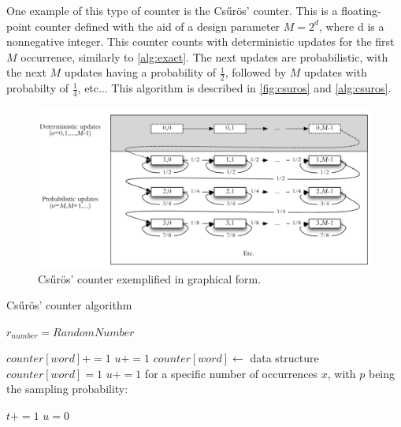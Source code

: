 One example of this type of counter is the Csűrös' counter. %
This is a floating-point counter defined with the aid of a design parameter $M = 2^d$, where d is a nonnegative integer.
This counter counts with deterministic updates for the first $M$ occurrence, similarly to \autoref{alg:exact}.
The next updates are probabilistic, with the next $M$ updates having a probability of $\frac{1}{2}$, followed by $M$ updates with probabilty of $\frac{1}{4}$, etc...
This algorithm is described in \autoref{fig:csuros} and \autoref{alg:csuros}.

\begin{figure}[!ht]
    \centering
    \includegraphics[width=0.9\linewidth]{figs/csuros.png}
    \caption{Csűrös' counter exemplified in graphical form.}
    \label{fig:csuros}
\end{figure}

\begin{algorithm}[ht!]
\caption{Csűrös' counter algorithm}
\label{alg:csuros}
\begin{algorithmic}



    \State $r_{number} = RandomNumber$

            \State $counter[word]+=1$
            \State $u +=1$
        \Else
            \State $counter[word] \gets$ data structure
            \State $counter[word]=1$
            \State $u +=1$
        \EndIf for a specific number of occurrences $x$, with $p$ being the sampling probability:

    \EndIf
        \State $t +=1$
        \State $u = 0$
    \EndIf
\EndFor
\end{algorithmic}
\end{algorithm}



